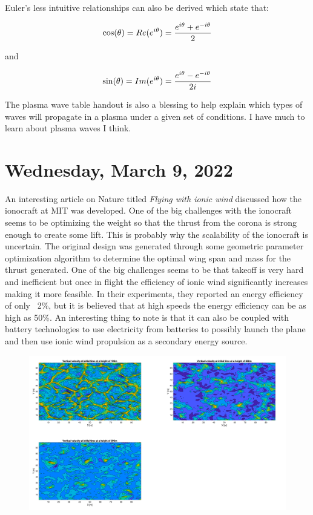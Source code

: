 \documentclass[12pt]{article}
\begin{document}
Euler's less intuitive relationships can also be derived which state that:

\begin{equation}
\centering
\cos(\theta) = Re(e^{i\theta}) = \frac{e^{i\theta}+e^{-i\theta}}{2}
\end{equation}

and

\begin{equation}
\centering
\sin(\theta) = Im(e^{i\theta}) = \frac{e^{i\theta} - e^{-i\theta}}{2i}
\end{equation}

The plasma wave table handout is also a blessing to help explain which types of waves will propagate in a plasma under a given set of conditions. I have much to learn about plasma waves I think. 

\section{Wednesday, March 9, 2022}

\par
An interesting article on Nature titled \textit{Flying with ionic wind} discussed how the ionocraft at MIT was developed. One of the big challenges with the ionocraft seems to be optimizing the weight so that the thrust from the corona is strong enough to create some lift.  This is probably why the scalability of the ionocraft is uncertain.  The original design was generated through some geometric parameter optimization algorithm to determine the optimal wing span and mass for the thrust generated.  One of the big challenges seems to be that takeoff is very hard and inefficient but once in flight the efficiency of ionic wind significantly increases making it more feasible. In their experiments, they reported an energy efficiency of only ~2\%, but it is believed that at high speeds the energy efficiency can be as high as 50\%. An interesting thing to note is that it can also be coupled with battery technologies to use electricity from batteries to possibly launch the plane and then use ionic wind propulsion as a secondary energy source.

\begin{figure}[H]
\centering
\includegraphics[width=\linewidth]{images/vertical_velocity_contour.pdf}
\end{figure}
\end{document}
